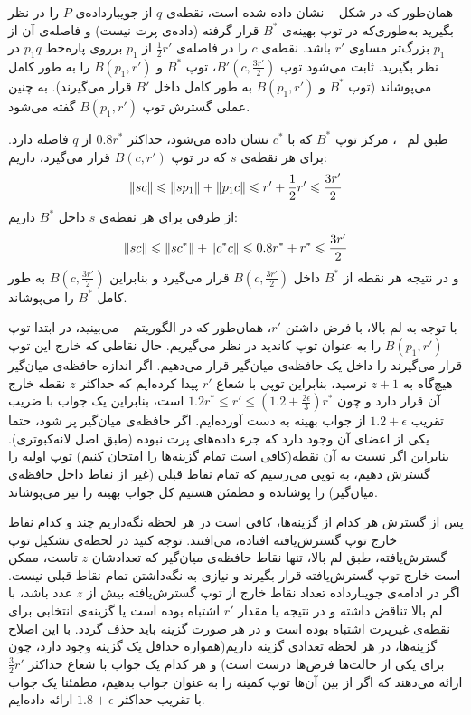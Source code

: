 
همان‌طور که در شکل ~ نشان داده شده است، نقطه‌ی $q$ از جویبارداده‌ی $P$ را در نظر بگیرید به‌طوری‌که در توپ بهینه‌ی $B^*$  قرار گرفته (داده‌ی پرت نیست) و فاصله‌ی آن از $p_1$ بزرگ‌تر مساوی $r'$ باشد. نقطه‌ی $c$ را در فاصله‌ی $\frac{1}{2}r'$ از $p_1$ برروی پاره‌خط $p_1q$ در نظر بگیرید. ثابت می‌شود توپ $B'(c, \frac{3r'}{2})$، توپ $B^*$ و $B(p_1, r')$ را به طور کامل می‌پوشاند (توپ $B^*$ و $B(p_1, r')$ به طور کامل داخل $B'$ قرار می‌گیرند). به چنین عملی گسترش توپ $B(p_1, r')$ گفته می‌شود.


طبق لم ~، مرکز‌ توپ $B^*$ که با $c^*$ نشان داده می‌شود، حداکثر $0.8r^*$ از $q$ فاصله دارد. برای هر نقطه‌ی $s$ که در توپ $B(c, r')$ قرار می‌گیرد، داریم:
$$\|{sc}\| \leqslant \|{sp_1}\|  + \|{p_1c}\| \leqslant r' + \frac{1}{2}r' \leqslant \frac{3r'}{2}$$
از طرفی برای هر نقطه‌ی $s$ داخل $B^*$  داریم:
$$\|{sc}\| \leqslant \|{sc^*}\|  + \|{c^*c}\| \leqslant 0.8r^* + r^* \leqslant \frac{3r'}{2}$$
و در نتیجه هر نقطه از $B^*$ داخل $B(c, \frac{3r'}{2})$ قرار می‌گیرد و بنابراین $B(c, \frac{3r'}{2})$ به طور کامل $B^*$ را می‌پوشاند. 



با توجه به لم بالا، با فرض داشتن $r'$، همان‌طور که در الگوریتم ~ می‌بینید، در ابتدا توپ $B(p_1, r')$ را به عنوان توپ کاندید در نظر می‌گیریم. حال نقاطی که خارج این توپ قرار می‌گیرند را داخل یک حافظه‌ی میان‌گیر قرار می‌دهیم. اگر اندازه حافظه‌ی میان‌گیر هیچ‌گاه به $z+1$ نرسید، بنابراین توپی با شعاع $r'$ پیدا کرده‌ایم که حداکثر $z$ نقطه خارج آن قرار دارد و چون  $1.2r^* \leq r' \leq (1.2 + \frac{2\epsilon}{3})r^*$ است، بنابراین یک جواب با ضریب تقریب $1.2 + \epsilon$ از جواب بهینه به دست آورده‌ایم. اگر حافظه‌ی میان‌گیر پر شود، حتما یکی از اعضای آن وجود دارد که جزء داده‌های پرت نبوده (طبق‌ اصل لانه‌کبوتری). بنابراین اگر نسبت به آن نقطه‌(کافی است تمام گزینه‌ها را امتحان کنیم) توپ اولیه را گسترش دهیم، به توپی می‌رسیم که تمام نقاط قبلی (غیر از نقاط داخل حافظه‌ی میان‌گیر) را پوشانده و مطمئن هستیم کل جواب بهینه را نیز می‌پوشاند. 

پس از گسترش هر کدام از  گزینه‌ها، کافی است در هر لحظه نگه‌داریم چند و کدام نقاط خارج توپ گسترش‌‌یافته افتاده، می‌افتند. توجه کنید در لحظه‌ی تشکیل توپ گسترش‌یافته، طبق لم بالا، تنها نقاط حافظه‌ی میان‌گیر که تعدادشان $z$ تاست، ممکن است خارج توپ گسترش‌یافته قرار بگیرند و نیازی به نگه‌داشتن تمام نقاط قبلی نیست. اگر در ادامه‌ی جویبارداده تعداد نقاط خارج از توپ گسترش‌یافته بیش از $z$ عدد باشد، با لم بالا تناقض داشته و در نتیجه یا مقدار $r'$ اشتباه بوده است یا گزینه‌ی انتخابی برای نقطه‌ی غیرپرت اشتباه بوده است و در هر صورت گزینه باید حذف گردد. با این اصلاح گزینه‌ها، در هر لحظه تعدادی گزینه داریم(همواره حداقل یک گزینه وجود دارد، چون برای یکی از حالت‌ها فرض‌ها درست است) و هر کدام یک جواب با شعاع حداکثر $\frac{3}{2}r'$ ارائه می‌دهند که اگر از بین آن‌ها توپ کمینه را به عنوان جواب بدهیم، مطمئنا یک جواب با تقریب حداکثر $1.8 + \epsilon$ ارائه داده‌ایم.

